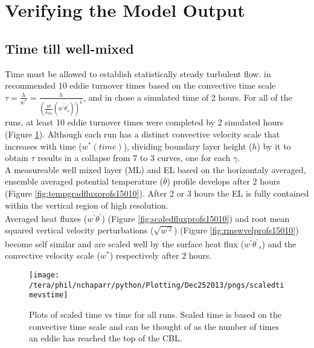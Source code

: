\clearpage

\section{Verifying the Model Output}
\label{sec:CheckingtheModel}
\subsection{Time till well-mixed}%
\FloatBarrier

Time must be allowed to establish statistically steady turbulent flow.  \citeauthor{SullMoengStev} in 
\cite{SullMoengStev} recommended 10 eddie turnover times based on the convective time scale 
$\tau = \frac{h}{w^{*}} = \frac{h}{ \left( \frac{gh}{\overline{\theta}_{ML}}(\overline{w^{'} \theta^{'}_{s}}) \right)^{\frac{1}{3}} } $, 
and \citeauthor{BrooksFowler2} in \cite{BrooksFowler2} chose a simulated time of 2 hours.  For all of 
the runs, at least 10 eddie turnover times were completed by 2 simulated hours (Figure \ref{fig:ScaledTimevsTime}).  
Although each run has a distinct convective velocity scale that increases with time ($w^{*}(time)$), 
dividing boundary layer height ($h$) by it to obtain $\tau$ results in a collapse from 7 to 3 curves, 
one for each $\gamma$.\\

A measureable well mixed layer (\acs{ML}) and \acs{EL} based on the horizontaly averaged, ensemble averaged
potential temperature ($\overline{\theta}$) profile develops after 2 hours 
(Figure \ref{fig:tempgradfluxprofs15010}).  After 2 or 3 hours the \acs{EL} is fully contained within the vertical 
region of high resolution.\\

Averaged heat fluxes ($\overline{w^{'}\theta^{'}}$) (Figure \ref{fig:scaledfluxprofs15010}) and 
root mean squared vertical velocity perturbations ($\sqrt{w^{'2}}$) (Figure \ref{fig:rmswvelprofs15010})
become self similar and are scaled well by the surface heat flux ($\overline{w^{'}\theta^{'}}_{s}$) 
and the convective velocity scale ($w^{*}$) respectively after 2 hours.\\


\begin{figure}[!h]
    \centering
    \texttt{[image: /tera/phil/nchaparr/python/Plotting/Dec252013/pngs/scaledtimevstime]}
    \caption{Plots of scaled time vs time for all runs.  Scaled time is based on the convective time scale 
    and can be thought of as the number of times an eddie has reached the top of the CBL. }
    \label{fig:ScaledTimevsTime}   
\end{figure}

